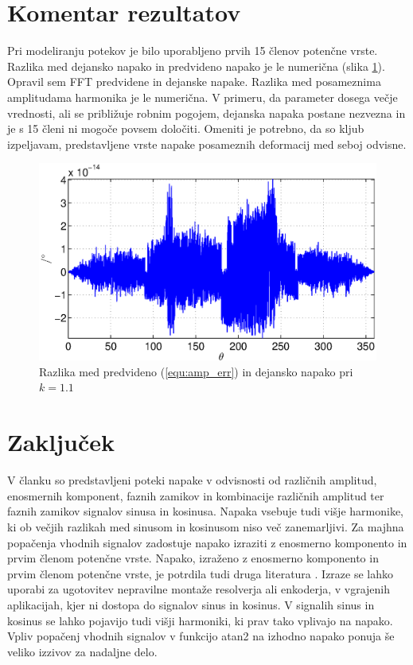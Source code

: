 \documentclass[a4paper]{article}
\begin{document}
\section{Komentar rezultatov}
Pri modeliranju potekov je bilo uporabljeno prvih 15 členov potenčne vrste. Razlika med dejansko napako in predvideno napako je le numerična (slika \ref{fig:razlika}). Opravil sem FFT predvidene in dejanske napake. Razlika med posameznima amplitudama harmonika je le numerična. V primeru, da parameter dosega večje vrednosti, ali se približuje robnim pogojem, dejanska napaka postane nezvezna in je s 15 členi ni mogoče povsem določiti. Omeniti je potrebno, da so kljub izpeljavam, predstavljene vrste napake posameznih deformacij med seboj odvisne.
\begin{figure}[!htb]
	\begin{center}
		\includegraphics[width=\linewidth]{./Slike/razlika_amp.eps}
		\caption{Razlika med predvideno (\ref{equ:amp_err}) in dejansko napako pri $k=1.1$} \label{fig:razlika}
	\end{center}
\end{figure}




\section{Zaključek}

V članku so predstavljeni poteki napake v odvisnosti od različnih amplitud, enosmernih komponent, faznih zamikov in kombinacije različnih amplitud ter faznih zamikov signalov sinusa in kosinusa. Napaka vsebuje tudi višje harmonike, ki ob večjih razlikah med sinusom in kosinusom niso več zanemarljivi. Za majhna popačenja vhodnih signalov zadostuje napako izraziti z enosmerno komponento in prvim členom potenčne vrste. Napako, izraženo z enosmerno komponento in prvim členom potenčne vrste, je potrdila tudi druga literatura \cite{RLS1}. Izraze se lahko uporabi za ugotovitev nepravilne montaže resolverja ali enkoderja, v vgrajenih aplikacijah, kjer ni dostopa do signalov sinus in kosinus. V signalih sinus in kosinus se lahko pojavijo tudi višji harmoniki, ki prav tako vplivajo na napako. Vpliv popačenj vhodnih signalov v  funkcijo atan2 na izhodno napako ponuja še veliko izzivov za nadaljne delo.
\end{document}
